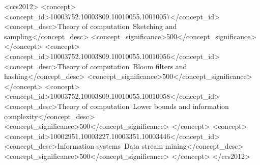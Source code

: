 \documentclass[sigconf]{acmart}
\begin{document}
\begin{CCSXML}
    <ccs2012>
        <concept>
            <concept_id>10003752.10003809.10010055.10010057</concept_id>
            <concept_desc>Theory of computation~Sketching and sampling</concept_desc>
            <concept_significance>500</concept_significance>
        </concept>
        <concept>
            <concept_id>10003752.10003809.10010055.10010056</concept_id>
            <concept_desc>Theory of computation~Bloom filters and hashing</concept_desc>
            <concept_significance>500</concept_significance>
        </concept>
        <concept>
            <concept_id>10003752.10003809.10010055.10010058</concept_id>
            <concept_desc>Theory of computation~Lower bounds and information complexity</concept_desc>
            <concept_significance>500</concept_significance>
        </concept>
        <concept>
            <concept_id>10002951.10003227.10003351.10003446</concept_id>
            <concept_desc>Information systems~Data stream mining</concept_desc>
            <concept_significance>500</concept_significance>
        </concept>
    </ccs2012>
\end{CCSXML}




\maketitle
\end{document}
